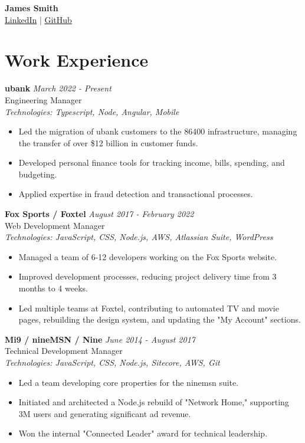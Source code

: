 \documentclass[a4paper,10pt]{article}
\begin{document}
\begin{center}
    {\Huge \textbf{James Smith}} \\
    \href{https://au.linkedin.com/pub/james-smith/4/902/2a7}{LinkedIn} | \href{https://github.com/digijin}{GitHub}
\end{center}

\section*{Work Experience}

\textbf{ubank} \hfill \textit{March 2022 - Present}  \\
Engineering Manager  \\
\textit{Technologies: Typescript, Node, Angular, Mobile}
\begin{itemize}
    \item Led the migration of ubank customers to the 86400 infrastructure, managing the transfer of over \$12 billion in customer funds.
    \item Developed personal finance tools for tracking income, bills, spending, and budgeting.
    \item Applied expertise in fraud detection and transactional processes.
\end{itemize}

\textbf{Fox Sports / Foxtel} \hfill \textit{August 2017 - February 2022}  \\
Web Development Manager  \\
\textit{Technologies: JavaScript, CSS, Node.js, AWS, Atlassian Suite, WordPress}
\begin{itemize}
    \item Managed a team of 6-12 developers working on the Fox Sports website.
    \item Improved development processes, reducing project delivery time from 3 months to 4 weeks.
    \item Led multiple teams at Foxtel, contributing to automated TV and movie pages, rebuilding the design system, and updating the "My Account" sections.
\end{itemize}

\textbf{Mi9 / nineMSN / Nine} \hfill \textit{June 2014 - August 2017}  \\
Technical Development Manager  \\
\textit{Technologies: JavaScript, CSS, Node.js, Sitecore, AWS, Git}
\begin{itemize}
    \item Led a team developing core properties for the ninemsn suite.
    \item Initiated and architected a Node.js rebuild of "Network Home," supporting 3M users and generating significant ad revenue.
    \item Won the internal "Connected Leader" award for technical leadership.
\end{itemize}
\end{document}
